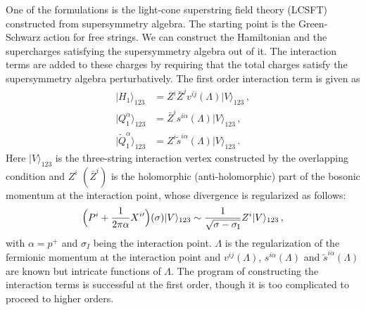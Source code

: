 \documentclass[12pt]{article}
\begin{document}
One of the formulations is the light-cone superstring field theory
(LCSFT) \cite{GS,GSB} constructed from supersymmetry algebra.
The starting point is the Green-Schwarz action for free strings.
We can construct the Hamiltonian and the supercharges satisfying the
supersymmetry algebra out of it.
The interaction terms are added to these charges by requiring that the 
total charges satisfy the supersymmetry algebra perturbatively.
The first order interaction term is given as
\begin{align}
|H_1\rangle_{123}&=Z^i\bar Z^jv^{ij}(\Lambda)|V\rangle_{123}\,,
\label{SFTH1}\\
|Q_1^{\dot\alpha}\rangle_{123}
&=\bar Z^is^{i\dot\alpha}(\Lambda)|V\rangle_{123}\,,\\
|\tilde Q_1^{\dot\alpha}\rangle_{123}
&=Z^i\tilde s^{i\dot\alpha}(\Lambda)|V\rangle_{123}\,.
\end{align}
Here $|V\rangle_{123}$ is the three-string interaction vertex
constructed by the overlapping condition and $Z^i$ $(\bar Z^i)$ is the
holomorphic (anti-holomorphic) part of the bosonic momentum at the
interaction point, whose divergence is regularized as follows:
\begin{align}
\Bigl(P^i+\frac{1}{2\pi\alpha}X^{i\prime}\Bigr)(\sigma)|V\rangle_{123}
\sim\frac{1}{\sqrt{\sigma-\sigma_{\rm I}}}Z^i|V\rangle_{123}\,,
\label{Zi}
\end{align}
with $\alpha=p^+$ and $\sigma_I$ being the interaction point.
$\Lambda$ is the regularization of the fermionic momentum at the
interaction point and $v^{ij}(\Lambda)$, $s^{i\dot\alpha}(\Lambda)$
and $\tilde s^{i\dot\alpha}(\Lambda)$ are known but intricate
functions of $\Lambda$.
The program of constructing the interaction terms is successful at the
first order, though it is too complicated to proceed to higher
orders.
\end{document}
